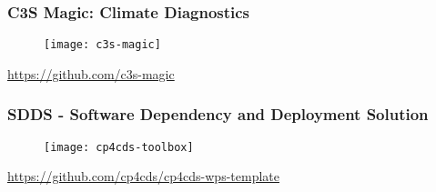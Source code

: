 \documentclass{beamer}
\begin{document}
\begin{frame}
\frametitle<presentation>{C3S Magic: Climate Diagnostics}

  \begin{figure}[ht]
    \centering
    \texttt{[image: c3s-magic]}
  \end{figure}

  \centering
  \footnotesize{\url{https://github.com/c3s-magic}}

\end{frame}

\begin{frame}
\frametitle<presentation>{SDDS - Software Dependency and Deployment Solution}

  \begin{figure}[ht]
    \centering
    \texttt{[image: cp4cds-toolbox]}
  \end{figure}

  \centering
  \footnotesize{\url{https://github.com/cp4cds/cp4cds-wps-template}}

\end{frame}
\end{document}
